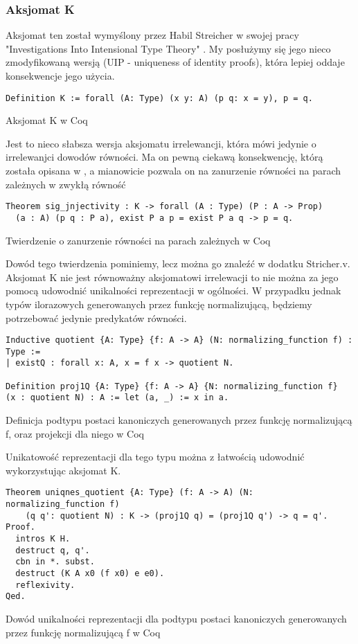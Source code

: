\subsubsection{Aksjomat K}
Aksjomat ten został wymyślony przez Habil Streicher w swojej pracy "Investigations Into Intensional Type Theory" \cite{Streicher}. My posłużymy się jego nieco zmodyfikowaną wersją (UIP - uniqueness of identity proofs), która lepiej oddaje konsekwencje jego użycia.
\begin{code}
\begin{verbatim}
Definition K := forall (A: Type) (x y: A) (p q: x = y), p = q.
\end{verbatim}
\caption{Aksjomat K w Coq}
\end{code}
Jest to nieco słabsza wersja aksjomatu irrelewancji, która mówi jedynie o irrelewanjci dowodów równości. Ma on pewną ciekawą konsekwencję, którą została opisana w \cite{Streicher}, a mianowicie pozwala on na zanurzenie równości na parach zależnych w zwykłą równość
\begin{code}
\begin{verbatim}
Theorem sig_jnjectivity : K -> forall (A : Type) (P : A -> Prop)
  (a : A) (p q : P a), exist P a p = exist P a q -> p = q.
\end{verbatim}
\caption{Twierdzenie o zanurzenie równości na parach zależnych w Coq}
\end{code}
Dowód tego twierdzenia pominiemy, lecz można go znaleźć w dodatku Stricher.v. Aksjomat K nie jest równoważny aksjomatowi irrelewacji \cite{gdzieś_dowód_tego} to nie można za jego pomocą udowodnić unikalności reprezentacji w ogólności. W przypadku jednak typów ilorazowych generowanych przez funkcję normalizującą, będziemy potrzebować jedynie predykatów równości.
\begin{code}
\begin{verbatim}
Inductive quotient {A: Type} {f: A -> A} (N: normalizing_function f) : Type :=
| existQ : forall x: A, x = f x -> quotient N.

Definition proj1Q {A: Type} {f: A -> A} {N: normalizing_function f} 
(x : quotient N) : A := let (a, _) := x in a.
\end{verbatim}
\caption{Definicja podtypu postaci kanoniczych generowanych przez funkcję normalizującą f, oraz projekcji dla niego w Coq}
\end{code}
Unikatowość reprezentacji dla tego typu można z łatwością udowodnić wykorzystując aksjomat K.
\begin{code}
\begin{verbatim}
Theorem uniqnes_quotient {A: Type} (f: A -> A) (N: normalizing_function f) 
    (q q': quotient N) : K -> (proj1Q q) = (proj1Q q') -> q = q'.
Proof.
  intros K H. 
  destruct q, q'. 
  cbn in *. subst. 
  destruct (K A x0 (f x0) e e0).
  reflexivity.
Qed.
\end{verbatim}
\caption{Dowód unikalności reprezentacji dla podtypu postaci kanoniczych generowanych przez funkcję normalizującą f w Coq}
\end{code}

